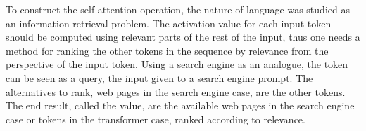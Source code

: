\documentclass[english,twoside,openright]{UH_DS_MSc}
\begin{document}
To construct the self-attention operation, the nature of language was studied 
as an information retrieval problem. The activation value for each input token should be computed 
using relevant parts of the rest of the input, thus one needs a method for ranking the other tokens 
in the sequence by relevance from the perspective of the input token. Using a search engine as an analogue, 
the token can be seen as a query, the input given to a search engine prompt. The alternatives to rank, 
web pages in the search engine case, are the other tokens. The end result, called the value, are the 
available web pages in the search engine case or tokens in the transformer case, ranked according to relevance.
\end{document}
